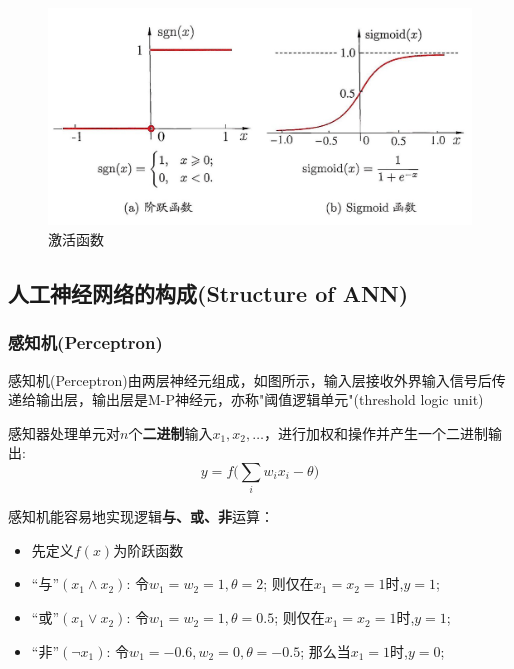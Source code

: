 \begin{figure}[h]
\small
\centering
\includegraphics[width=14cm]{figure//4.jpg}
\caption{激活函数} \label{fig:4}
\end{figure}


\subsection{人工神经网络的构成(Structure of ANN)}
\subsubsection{感知机(Perceptron)}

感知机(Perceptron)由两层神经元组成，如图所示，输入层接收外界输入信号后传递给输出层，输出层是M-P神经元，亦称"阈值逻辑单元"(threshold logic unit)

感知器处理单元对$n$个\textbf{二进制}输入$x_1,x_2,\ldots$，进行加权和操作并产生一个二进制输出:
\[\boxed{y=f\big(\sum_i w_ix_i-\theta\big)}\]

感知机能容易地实现逻辑\textbf{与、或、非}运算：

\begin{itemize}

\item 先定义$f(x)$为阶跃函数

\item “与”$(x_1\wedge x_2)$: 
令$w_1=w_2=1,\theta=2$;
则仅在$x_1=x_2=1$时,$y=1$;

\item “或”$(x_1\vee x_2)$: 
令$w_1=w_2=1,\theta=0.5$;
则仅在$x_1=x_2=1$时,$y=1$;

\item “非”$(\neg x_1)$: 
令$w_1=-0.6,w_2=0,\theta=-0.5$;
那么当$x_1=1$时,$y=0$;
\end{itemize}

